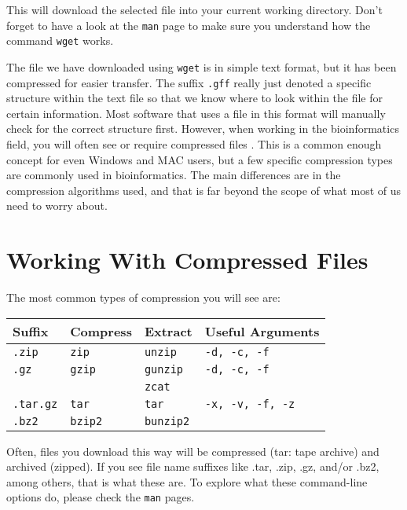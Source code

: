 This will download the selected file into your current working directory.
Don't forget to have a look at the \texttt{man} page to make sure you understand how the command \texttt{wget} works.

\begin{information}
The file we have downloaded using \texttt{wget} is in simple text format, but it has been compressed for easier transfer.
The suffix \texttt{.gff} really just denoted a specific structure within the text file so that we know where to look within the file for certain information.
Most software that uses a file in this format will manually check for the correct structure first.
However, when working in the bioinformatics field,  you will often see or require compressed files .
This is a common enough concept for even Windows and MAC users, but a few specific compression types are commonly used in bioinformatics.
The main differences are in the compression algorithms used, and that is far beyond the scope of what most of us need to worry about.
\end{information}


\section{Working With Compressed Files}


The most common types of compression you will see are:\\
\begin{center}
	\begin{tabular}{ p{2cm}  p{3cm}  p{3cm}   p{4cm}}
		\toprule
		\textbf{Suffix} & \textbf{Compress} & \textbf{Extract} & \textbf{Useful Arguments} \\
		\midrule
		\texttt{.zip} & \texttt{zip} & \texttt{unzip} & \texttt{-d, -c, -f} \\
		\midrule
		\texttt{.gz} & \texttt{gzip} & \texttt{gunzip} & \texttt{-d, -c, -f} \\
								 &								& \texttt{zcat} & \\
		\midrule
		\texttt{.tar.gz} & \texttt{tar} & \texttt{tar} & \texttt{-x, -v, -f, -z} \\
		\midrule
		\texttt{.bz2} & \texttt{bzip2} & \texttt{bunzip2} & \\
		\bottomrule
	\end{tabular}
\end{center}

Often, files you download this way will be compressed (tar: tape archive) and archived (zipped). 
If you see file name suffixes like .tar, .zip, .gz, and/or .bz2, among others, that is what these are.  
To explore what these command-line options do, please check the \texttt{man} pages. \\

